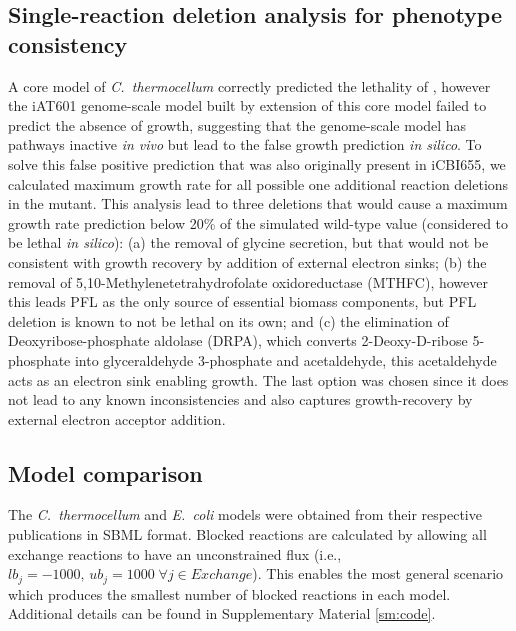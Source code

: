 \subsection{Single-reaction deletion analysis for phenotype consistency}\label{sec:deletion_analysis}
A core model of \textit{C.~thermocellum}\citep{thompson2015} correctly predicted the lethality of , however the iAT601 genome-scale model built by extension of this core model failed to predict the absence of growth, suggesting that the genome-scale model has pathways inactive \textit{in vivo} but lead to the false growth prediction \textit{in silico}.  To solve this false positive prediction that was also originally present in iCBI655, we calculated maximum growth rate for all possible one additional reaction deletions in the  mutant. This analysis lead to three deletions that would cause a maximum growth rate prediction below 20\% of the simulated wild-type value (considered to be lethal \textit{in silico}\citep{palsson2015}):
(a) the removal of glycine secretion, but that would not be consistent with growth recovery by addition of external electron sinks;
(b) the removal of 5,10-Methylenetetrahydrofolate oxidoreductase (MTHFC), however this leads PFL as the only source of essential biomass components, but PFL deletion is known to not be lethal on its own;\citep{papanek2015}
and (c) the elimination of Deoxyribose-phosphate aldolase (DRPA), which converts
2-Deoxy-D-ribose 5-phosphate into glyceraldehyde 3-phosphate and acetaldehyde, this acetaldehyde acts as an electron sink enabling growth.
The last option was chosen since it does not lead to any known inconsistencies and also captures growth-recovery by external electron acceptor addition.\citep{thompson2015}

\subsection{Model comparison}
The \textit{C.~thermocellum} and \textit{E.~coli} models were obtained from their respective publications in SBML format.
Blocked reactions are calculated by allowing all exchange reactions to have an unconstrained flux (i.e., $lb_j=-1000,\, ub_j=1000 \; \forall j \in \mathit{Exchange}$).
This enables the most general scenario which produces the smallest number of blocked reactions in each model. Additional details can be found in Supplementary Material \ref{sm:code}.

